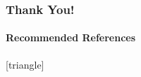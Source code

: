 \documentclass[18pt,xcolor=table]{beamer}
\begin{document}
\begin{frame}[noframenumbering,shrink=10]
\frametitle{Thank You!}
\framesubtitle{Recommended References}
    \nocite{DPGOverview}
    \nocite{DPGEncyclopedia}
    \nocite{EllisRobustnessReport}
    \nocite{CamelliaDPG}
    \nocite{RobertsDPGNavierStokes}
    \renewcommand*{\bibfont}{\small}
    [triangle]
    \printbibliography[keyword=main]
    \bigskip
    \printbibliography[notkeyword=main]
\end{frame}
\end{document}
